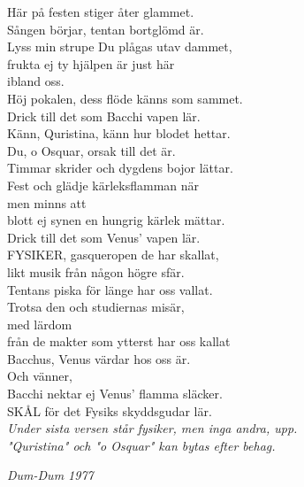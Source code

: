 \documentclass[a6paper,10pt]{article}
\begin{document}
\noindent
{}
\begin{center}
\end{center}
\small Här på festen stiger åter glammet.\\
Sången börjar, tentan bortglömd är.\\
Lyss min strupe Du plågas utav dammet,\\
frukta ej ty hjälpen är just här\\
ibland oss.\\
Höj pokalen, dess flöde känns som sammet.\\
Drick till det som Bacchi vapen lär.
\vspace{5pt}\\
Känn, Quristina, känn hur blodet hettar.\\
Du, o Osquar, orsak till det är.\\
Timmar skrider och dygdens bojor lättar.\\
Fest och glädje kärleksflamman när\\
men minns att\\
blott ej synen en hungrig kärlek mättar.\\
Drick till det som Venus' vapen lär.
\vspace{5pt}\\
FYSIKER, gasqueropen de har skallat,\\
likt musik från någon högre sfär.\\
Tentans piska för länge har oss vallat.\\
Trotsa den och studiernas misär,\\
med lärdom\\
från de makter som ytterst har oss kallat\\
Bacchus, Venus värdar hos oss är.\\
Och vänner,\\
Bacchi nektar ej Venus' flamma släcker. \\
SKÅL för det Fysiks skyddsgudar lär. 
\vspace{5pt}\\
\textit{Under sista versen står fysiker, men inga andra, upp.\\ "Quristina" och "o Osquar" kan bytas efter behag.}
\begin{flushright}
\textit{Dum-Dum 1977}
\end{flushright}
\end{document}
